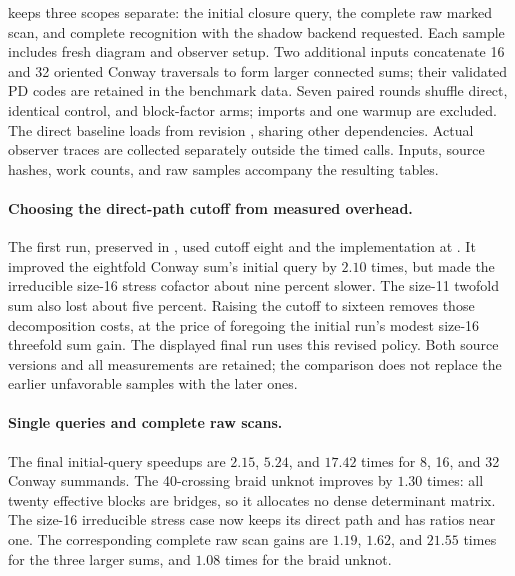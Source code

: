  keeps three scopes separate: the initial
closure query, the complete raw marked scan, and complete recognition with
the shadow backend requested.  Each sample includes fresh diagram and
observer setup.  Two additional inputs concatenate 16 and 32 oriented Conway traversals to
form larger connected sums; their validated PD codes are retained in the
benchmark data.  Seven paired rounds shuffle direct, identical control, and
block-factor arms; imports and one warmup are excluded.  The direct baseline
loads  from revision , sharing other
dependencies.  Actual observer traces are collected separately outside the
timed calls.  Inputs, source hashes, work counts, and raw samples accompany
the resulting tables.



\paragraph{Choosing the direct-path cutoff from measured overhead.}
The first run, preserved in
, used cutoff eight
and the implementation at .  It improved the eightfold Conway
sum's initial query by $2.10$ times, but made the irreducible size-16 stress
cofactor about nine percent slower.  The size-11 twofold sum also lost about
five percent.  Raising the cutoff to sixteen removes those decomposition
costs, at the price of foregoing the initial run's modest size-16 threefold
sum gain.  The displayed final run uses this revised policy.  Both source
versions and all measurements are retained; the comparison does not replace
the earlier unfavorable samples with the later ones.

\paragraph{Single queries and complete raw scans.}
The final initial-query speedups are $2.15$, $5.24$, and $17.42$ times for
8, 16, and 32 Conway summands.  The 40-crossing braid unknot improves by
$1.30$ times: all twenty effective blocks are bridges, so it allocates no
dense determinant matrix.  The size-16 irreducible stress case now keeps
its direct path and has ratios near one.  The corresponding complete raw
scan gains are $1.19$, $1.62$, and $21.55$ times for the three larger sums,
and $1.08$ times for the braid unknot.

